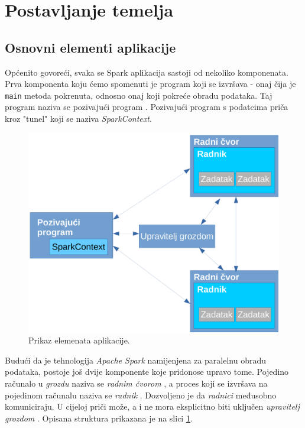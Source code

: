 \documentclass[times, utf8, zavrsni, numeric]{fer}
\begin{document}
\section{Postavljanje temelja}
\subsection{Osnovni elementi aplikacije}
Općenito govoreći, svaka se Spark aplikacija sastoji  od nekoliko komponenata. Prva komponenta koju ćemo spomenuti je program koji se izvršava - onaj čija je \texttt{main} metoda pokrenuta, odnosno onaj koji pokreće obradu podataka. Taj program naziva se pozivajući program . Pozivajući program s podatcima priča kroz "tunel" koji se naziva \emph{SparkContext}.

\begin{figure}[htb]
\centering
\includegraphics[scale=0.55]{img/elementiAplikacijeCropped.pdf}
\caption{Prikaz elemenata aplikacije.}
\label{fig:cluster-overview}
\end{figure}

Budući da je tehnologija \emph{Apache Spark} namijenjena za paralelnu obradu podataka, postoje još dvije komponente koje pridonose upravo tome. Pojedino računalo u \emph{grozdu}  naziva se \emph{radnim čvorom} , a proces koji se izvršava na pojedinom računalu naziva se \emph{radnik} . Dozvoljeno je da \emph{radnici} međusobno komuniciraju. U cijeloj priči može, a i ne mora eksplicitno biti uključen \emph{upravitelj grozdom} .
Opisana struktura prikazana je na slici \ref{fig:cluster-overview}.
\end{document}
